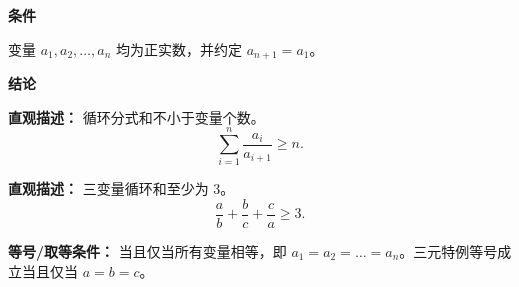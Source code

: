 \begin{statementbox}

\textbf{\textcolor{CStatement}{条件}}
\begin{description}[style=nextline, leftmargin=2.8em, labelsep=0.5em, itemsep=0.35em]
    \item[\textbf{\textcolor{CStatement}{条件 1（变量正实）：}}] 变量 $a_1, a_2, \dots, a_n$ 均为正实数，并约定 $a_{n+1} = a_1$。
\end{description}

\textbf{\textcolor{CStatement}{结论}}
\begin{description}[style=nextline, leftmargin=2.8em, labelsep=0.5em, itemsep=0.45em]
    \item[\textbf{\textcolor{CStatement}{结论一（循环和不等式）：}}]
    \textbf{\textcolor{CStatement}{直观描述：}} 循环分式和不小于变量个数。
    \[
    \sum_{i=1}^{n} \frac{a_i}{a_{i+1}} \ge n.
    \]

    \item[\textbf{\textcolor{CStatement}{推广结论（三元特例）：}}]
    \textbf{\textcolor{CStatement}{直观描述：}} 三变量循环和至少为 3。
    \[
    \frac{a}{b} + \frac{b}{c} + \frac{c}{a} \ge 3.
    \]
\end{description}

\textbf{\textcolor{CStatement}{等号/取等条件：}} 当且仅当所有变量相等，即 $a_1 = a_2 = \dots = a_n$。三元特例等号成立当且仅当 $a=b=c$。

\end{statementbox}
